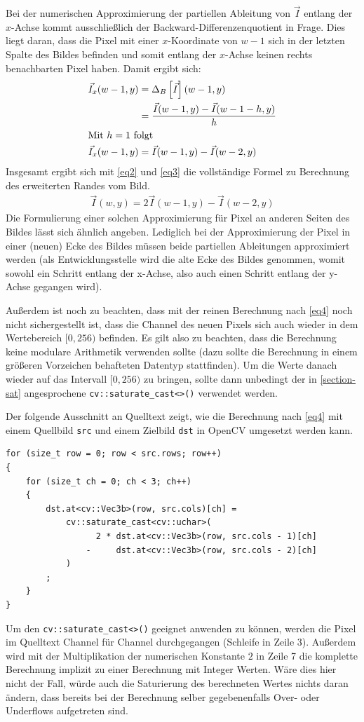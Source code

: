 \documentclass{whswinvcbook}
\begin{document}
Bei der numerischen Approximierung der partiellen Ableitung von $\vec{I}$ entlang der $x$-Achse kommt ausschließlich der Backward-Differenzenquotient in Frage. Dies liegt daran, dass die Pixel mit einer $x$-Koordinate von $w-1$ sich in der letzten Spalte des Bildes befinden und somit entlang der $x$-Achse keinen rechts benachbarten Pixel haben. Damit ergibt sich:
\begin{align} \label{eq3}
    \vec{I}_x(w-1,y) &= \Delta_B\left[\vec{I}\right](w-1,y) \nonumber \\
    &= \frac{\vec{I}(w-1,y)-\vec{I}(w-1-h,y)}{h} \nonumber \\
\shortintertext{Mit $h=1$ folgt}
    \vec{I}_x(w-1,y) &= \vec{I}(w-1,y)-\vec{I}(w-2,y)
\end{align}
Insgesamt ergibt sich mit \ref{eq2} und \ref{eq3} die vollständige Formel zu Berechnung des erweiterten Randes vom Bild.
\begin{align} \label{eq4}
    \vec{I}(w,y)=2\vec{I}(w-1,y)-\vec{I}(w-2,y)
\end{align}
Die Formulierung einer solchen Approximierung für Pixel an anderen Seiten des Bildes lässt sich ähnlich angeben. Lediglich bei der Approximierung der Pixel in einer (neuen) Ecke des Bildes müssen beide partiellen Ableitungen approximiert werden (als Entwicklungsstelle wird die alte Ecke des Bildes genommen, womit sowohl ein Schritt entlang der x-Achse, also auch einen Schritt entlang der y-Achse gegangen wird).

Außerdem ist noch zu beachten, dass mit der reinen Berechnung nach \ref{eq4} noch nicht sichergestellt ist, dass die Channel des neuen Pixels sich auch wieder in dem Wertebereich $[0,256)$ befinden. Es gilt also zu beachten, dass die Berechnung keine modulare Arithmetik verwenden sollte (dazu sollte die Berechnung in einem größeren Vorzeichen behafteten Datentyp stattfinden). Um die Werte danach wieder auf das Intervall $[0,256)$ zu bringen, sollte dann unbedingt der in \ref{section-sat} angesprochene \texttt{cv::saturate\_cast<>()} verwendet werden.

Der folgende Ausschnitt an Quelltext zeigt, wie die Berechnung nach \ref{eq4} mit einem Quellbild \texttt{src} und einem Zielbild \texttt{dst} in OpenCV umgesetzt werden kann.
\begin{lstlisting}[caption=Lineare Approximierung (nach Taylor) von Pixel am rechten Bildrand, label=lst-pred-sat]
for (size_t row = 0; row < src.rows; row++)
{
    for (size_t ch = 0; ch < 3; ch++)
    {
        dst.at<cv::Vec3b>(row, src.cols)[ch] =
            cv::saturate_cast<cv::uchar>(
                  2 * dst.at<cv::Vec3b>(row, src.cols - 1)[ch]
                -     dst.at<cv::Vec3b>(row, src.cols - 2)[ch]
            )
        ;
    }
}
\end{lstlisting}
Um den \texttt{cv::saturate\_cast<>()} geeignet anwenden zu können, werden die Pixel im Quelltext Channel für Channel durchgegangen (Schleife in Zeile 3). Außerdem wird mit der Multiplikation der numerischen Konstante $2$ in Zeile 7 die komplette Berechnung implizit zu einer Berechnung mit Integer Werten. Wäre dies hier nicht der Fall, würde auch die Saturierung des berechneten Wertes nichts daran ändern, dass bereits bei der Berechnung selber gegebenenfalls Over- oder Underflows aufgetreten sind.
\end{document}
